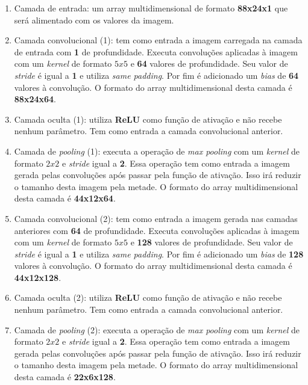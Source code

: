 \begin{enumerate}

\item Camada de entrada: um array multidimensional de formato
  {\bf 88x24x1} que será alimentado com os valores da imagem.

\item Camada convolucional (1): tem como entrada a imagem carregada na
  camada de entrada com {\bf 1} de profundidade. Executa convoluções
  aplicadas à imagem com um \textit{kernel} de formato $5x5$ e {\bf
    64} valores de profundidade. Seu valor de \textit{stride} é igual
  a {\bf 1} e utiliza \textit{same padding}. Por fim é adicionado um
  \textit{bias} de {\bf 64} valores à convolução. O formato do array
  multidimensional desta camada é {\bf 88x24x64}.

\item Camada oculta (1): utiliza {\bf ReLU} como função de ativação e
  não recebe nenhum parâmetro. Tem como entrada a camada convolucional
  anterior.

\item Camada de \textit{pooling} (1): executa a operação de
  \textit{max pooling} com um \textit{kernel} de formato $2x2$ e
  \textit{stride} igual a {\bf 2}. Essa operação tem como entrada a
  imagem gerada pelas convoluções após passar pela função de
  ativação. Isso irá reduzir o tamanho desta imagem pela metade. O
  formato do array multidimensional desta camada é {\bf 44x12x64}.

\item Camada convolucional (2): tem como entrada a imagem gerada
  nas camadas anteriores com {\bf 64} de profundidade. Executa
  convoluções aplicadas à imagem com um \textit{kernel} de formato
  $5x5$ e {\bf 128} valores de profundidade. Seu valor de
  \textit{stride} é igual a {\bf 1} e utiliza \textit{same
    padding}. Por fim é adicionado um \textit{bias} de {\bf 128}
  valores à convolução. O formato do array multidimensional desta
  camada é {\bf 44x12x128}.

\item Camada oculta (2): utiliza {\bf ReLU} como função de ativação e
  não recebe nenhum parâmetro. Tem como entrada a camada convolucional
  anterior.

\item Camada de \textit{pooling} (2): executa a operação de
  \textit{max pooling} com um \textit{kernel} de formato $2x2$ e
  \textit{stride} igual a {\bf 2}. Essa operação tem como entrada a
  imagem gerada pelas convoluções após passar pela função de
  ativação. Isso irá reduzir o tamanho desta imagem pela metade. O
  formato do array multidimensional desta camada é {\bf 22x6x128}.


\end{enumerate}
